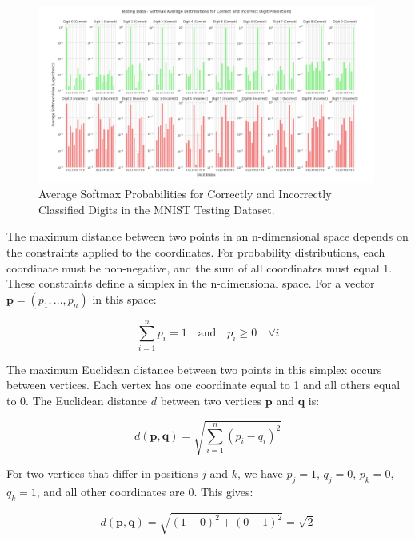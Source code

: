 \begin{figure}[h]
    \centering
    \includegraphics[width=0.99\textwidth]{Figures/Methods/MNIST_Softmax_Averages_Testing.png}
    \caption{Average Softmax Probabilities for Correctly and Incorrectly Classified Digits in the MNIST Testing Dataset.}
    \label{fig:MNIST_Softmax_Averages_Testing}
\end{figure}


The maximum distance between two points in an n-dimensional space depends on the constraints applied to the coordinates. For probability distributions, each coordinate must be non-negative, and the sum of all coordinates must equal 1. These constraints define a simplex in the n-dimensional space. For a vector $\mathbf{p} = (p_1, ..., p_n)$ in this space:

\begin{equation}
\sum_{i=1}^n p_i = 1 \quad \text{and} \quad p_i \geq 0 \quad \forall i
\end{equation}

The maximum Euclidean distance between two points in this simplex occurs between vertices. Each vertex has one coordinate equal to 1 and all others equal to 0. The Euclidean distance $d$ between two vertices $\mathbf{p}$ and $\mathbf{q}$ is:

\begin{equation}
d(\mathbf{p}, \mathbf{q}) = \sqrt{\sum_{i=1}^n (p_i - q_i)^2}
\end{equation}

For two vertices that differ in positions $j$ and $k$, we have $p_j = 1$, $q_j = 0$, $p_k = 0$, $q_k = 1$, and all other coordinates are 0. This gives:

\begin{equation}
d(\mathbf{p}, \mathbf{q}) = \sqrt{(1-0)^2 + (0-1)^2} = \sqrt{2}
\end{equation}

